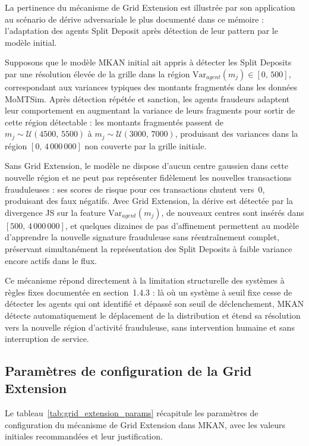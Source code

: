 \documentclass[11pt,a4paper,oneside]{report}
\theoremstyle{definition}
\theoremstyle{remark}
\begin{document}
La pertinence du mécanisme de Grid Extension est illustrée par son application au scénario de dérive adversariale le plus documenté dans ce mémoire : l'adaptation des agents Split Deposit après détection de leur pattern par le modèle initial.

Supposons que le modèle MKAN initial ait appris à détecter les Split Deposits par une résolution élevée de la grille dans la région $\text{Var}_{agent}(m_j) \in [0,\, 500]$, correspondant aux variances typiques des montants fragmentés dans les données MoMTSim. Après détection répétée et sanction, les agents fraudeurs adaptent leur comportement en augmentant la variance de leurs fragments pour sortir de cette région détectable : les montants fragmentés passent de $m_j \sim \mathcal{U}(4500,\, 5500)$ à $m_j \sim \mathcal{U}(3000,\, 7000)$, produisant des variances dans la région $[0,\, 4\,000\,000]$ non couverte par la grille initiale.

Sans Grid Extension, le modèle ne dispose d'aucun centre gaussien dans cette nouvelle région et ne peut pas représenter fidèlement les nouvelles transactions frauduleuses : ses scores de risque pour ces transactions chutent vers~$0$, produisant des faux négatifs. Avec Grid Extension, la dérive est détectée par la divergence JS sur la feature $\text{Var}_{agent}(m_j)$, de nouveaux centres sont insérés dans $[500,\, 4\,000\,000]$, et quelques dizaines de pas d'affinement permettent au modèle d'apprendre la nouvelle signature frauduleuse sans réentraînement complet, préservant simultanément la représentation des Split Deposits à faible variance encore actifs dans le flux.

Ce mécanisme répond directement à la limitation structurelle des systèmes à règles fixes documentée en section~1.4.3 : là où un système à seuil fixe cesse de détecter les agents qui ont identifié et dépassé son seuil de déclenchement, MKAN détecte automatiquement le déplacement de la distribution et étend sa résolution vers la nouvelle région d'activité frauduleuse, sans intervention humaine et sans interruption de service.

\subsection{Paramètres de configuration de la Grid Extension}

Le tableau~\ref{tab:grid_extension_params} récapitule les paramètres de configuration du mécanisme de Grid Extension dans MKAN, avec les valeurs initiales recommandées et leur justification.
\end{document}

